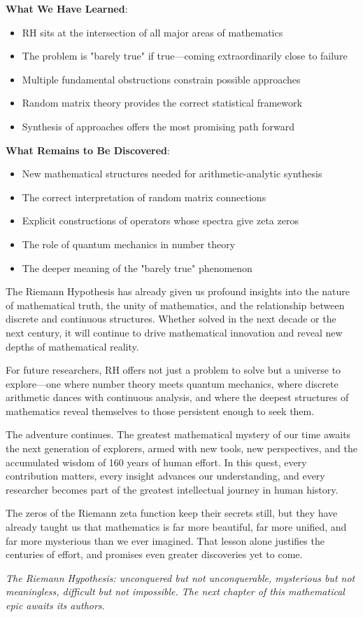 \begin{final_assessment}
\textbf{What We Have Learned}:
\begin{itemize}
\item RH sits at the intersection of all major areas of mathematics
\item The problem is "barely true" if true—coming extraordinarily close to failure
\item Multiple fundamental obstructions constrain possible approaches
\item Random matrix theory provides the correct statistical framework
\item Synthesis of approaches offers the most promising path forward
\end{itemize}

\textbf{What Remains to Be Discovered}:
\begin{itemize}
\item New mathematical structures needed for arithmetic-analytic synthesis
\item The correct interpretation of random matrix connections
\item Explicit constructions of operators whose spectra give zeta zeros
\item The role of quantum mechanics in number theory
\item The deeper meaning of the "barely true" phenomenon
\end{itemize}
\end{final_assessment}

The Riemann Hypothesis has already given us profound insights into the nature of mathematical truth, the unity of mathematics, and the relationship between discrete and continuous structures. Whether solved in the next decade or the next century, it will continue to drive mathematical innovation and reveal new depths of mathematical reality.

For future researchers, RH offers not just a problem to solve but a universe to explore—one where number theory meets quantum mechanics, where discrete arithmetic dances with continuous analysis, and where the deepest structures of mathematics reveal themselves to those persistent enough to seek them.

The adventure continues. The greatest mathematical mystery of our time awaits the next generation of explorers, armed with new tools, new perspectives, and the accumulated wisdom of 160 years of human effort. In this quest, every contribution matters, every insight advances our understanding, and every researcher becomes part of the greatest intellectual journey in human history.

The zeros of the Riemann zeta function keep their secrets still, but they have already taught us that mathematics is far more beautiful, far more unified, and far more mysterious than we ever imagined. That lesson alone justifies the centuries of effort, and promises even greater discoveries yet to come.

\emph{The Riemann Hypothesis: unconquered but not unconquerable, mysterious but not meaningless, difficult but not impossible. The next chapter of this mathematical epic awaits its authors.}
